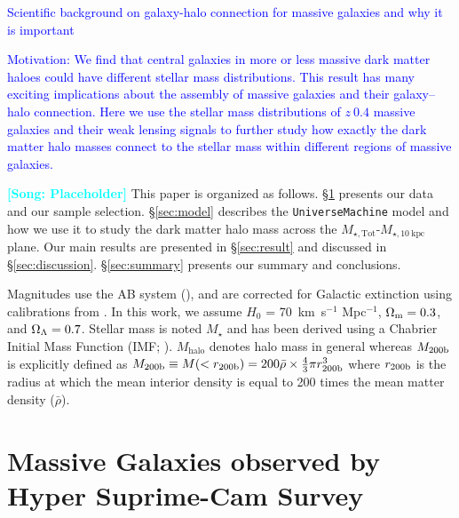\documentclass[a4paper,fleqn,usenatbib]{mnras}
\def\mstar{{$M_{\star}$}}
\def\mtot{{$M_{\star,\mathrm{Tot}}$}}
\def\minn{{$M_{\star,10\ \mathrm{kpc}}$}}
\def\um{\texttt{UniverseMachine}}
\newcommand{\plan}[1]{\textcolor{blue}{#1}}
\newcommand{\song}[1]{\textcolor{cyan}{\textbf{[Song: #1]}}}
\begin{document}
	\plan{Scientific background on galaxy-halo connection for massive galaxies and 
	      why it is important}
	 
	\plan{Motivation: We find that central galaxies in more or less massive dark 
	      matter haloes could have different stellar mass distributions. 
	      This result has many exciting implications about the assembly of massive 
	      galaxies and their galaxy--halo connection. 
	      Here we use the stellar mass distributions of $z~0.4$ massive galaxies 
	      and their weak lensing signals to further study how exactly the dark 
	      matter halo masses connect to the stellar mass within different regions 
	      of massive galaxies. 
	      }
    
    \song{Placeholder} 
    This paper is organized as follows. 
    \S \ref{sec:data} presents our data and our sample selection. 
    \S \ref{sec:model} describes the \um{} model and how we use it to study the 
    dark matter halo mass across the \mtot{}-\minn{} plane. 
    Our main results are presented in \S \ref{sec:result} and discussed in 
    \S \ref{sec:discussion}. 
    \S \ref{sec:summary} presents our summary and conclusions.

    Magnitudes use the AB system (\citealt{Oke1983}), and are corrected for Galactic 
    extinction using calibrations from \citet{Schlafly11}.
    In this work, we assume $H_0$ = 70~km~s$^{-1}$ Mpc$^{-1}$, ${\Omega}_{\rm m}=0.3$, 
    and ${\Omega}_{\rm \Lambda}=0.7$.
    Stellar mass is noted \mstar{} and has been derived using a Chabrier Initial Mass 
    Function (IMF; \citealt{Chabrier2003}).     
    $M_{\mathrm{halo}}$ denotes halo mass in general whereas $M_{\rm 200b}$ is 
    explicitly defined as $M_{\rm 200b}\equiv M(<r_{\rm 200b})=200\bar{\rho} 
    \times \frac{4}{3}\pi r_{\rm 200b}^3$ where $r_{\rm 200b}$
    is the radius at which the mean interior density is equal to 200 times
    the mean matter density ($\bar{\rho}$). 
    

\section{Massive Galaxies observed by Hyper Suprime-Cam Survey}
    \label{sec:data}
    
\end{document}
